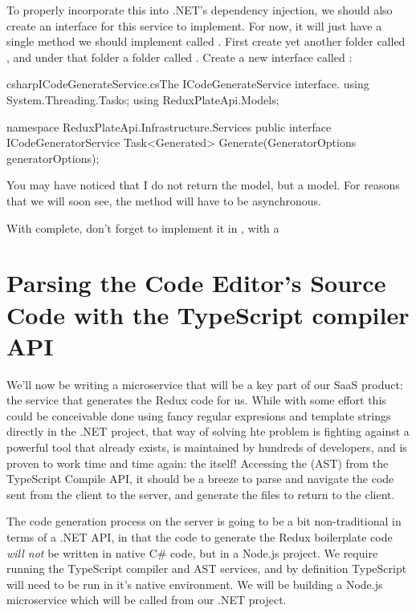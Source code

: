 \documentclass[a4paper,headinclude=on,footinclude=on,12pt,oneside]{scrbook}
\begin{document}
To properly incorporate this into .NET's dependency injection, we should also create an interface for this service to implement. For now, it will just have a single method we should implement called . First create yet another folder called , and under that folder a folder called . Create a new interface called :

\begin{codeInput}{csharp}{ICodeGenerateService.cs}{The ICodeGenerateService interface.}
using System.Threading.Tasks;
using ReduxPlateApi.Models;

namespace ReduxPlateApi.Infrastructure.Services
{
    public interface ICodeGeneratorService
    {
        Task<Generated> Generate(GeneratorOptions generatorOptions);
    }
}
\end{codeInput}

You may have noticed that I do not return the  model, but a  model. For reasons that we will soon see, the  method will have to be asynchronous. 

With  complete, don't forget to implement it in , with a 

\section{Parsing the Code Editor's Source Code with the TypeScript compiler API}

We'll now be writing a microservice that will be a key part of our SaaS product: the service that generates the Redux code for us. While with some effort this could be conceivable done using fancy regular expresions and template strings directly in the .NET project, that way of solving hte problem is fighting against a powerful tool that already exists, is maintained by hundreds of developers, and is proven to work time and time again: the  itself! Accessing the  (AST) from the TypeScript Compile API, it should be a breeze to parse and navigate the code sent from the client to the server, and generate the files to return to the client.


The code generation process on the server is going to be a bit non-traditional in terms of a .NET API, in that the code to generate the Redux boilerplate code \textit{will not} be written in native C\# code, but in a Node.js project. We require running the TypeScript compiler and AST services, and by definition TypeScript will need to be run in it's native environment. We will be building a Node.js microservice which will be called from our .NET project.
\end{document}

